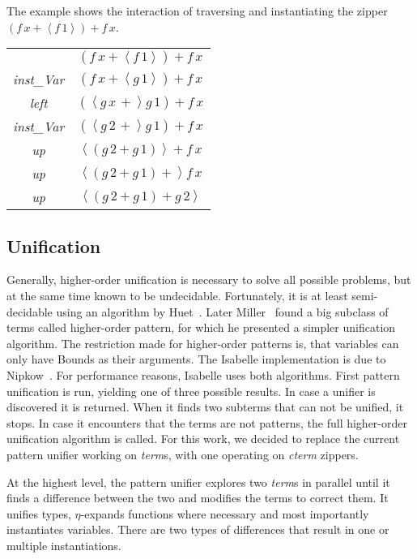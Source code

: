 \documentclass[12pt,a4paper]{article}
\newcommand{\type}[1]{\textit{#1}}
\newcommand{\function}[1]{\textit{#1}}
\begin{document}
The example shows the interaction of traversing and instantiating the zipper \((f\,x + \left\langle f\,1 \right\rangle) + f\,x\).

{
    \begin{center}
\begin{tabular}{cc}
&\((f\,x + \left\langle f\,1 \right\rangle) + f\,x\)\\
\function{inst\_Var}&\((f\,x + \left\langle g\,1 \right\rangle) + f\,x\)\\
\function{left}&\((\left\langle g\,x\,+ \right\rangle g\,1) + f\,x\)\\
\function{inst\_Var}&\((\left\langle g\,2\,+ \right\rangle g\,1) + f\,x\)\\
\function{up}&\(\left\langle( g\,2 + g\,1)\right\rangle + f\,x\)\\
\function{up}&\(\left\langle( g\,2 + g\,1) + \right\rangle f\,x\)\\
\function{up}&\(\left\langle( g\,2 + g\,1) + g\,2 \right\rangle\)
\end{tabular}
\end{center}
}

\subsection*{Unification}
Generally, higher-order unification is necessary to solve all possible problems, but at the same time known to be undecidable.
Fortunately, it is at least semi-decidable using an algorithm by Huet~\cite{Huet1975}.
Later Miller~\cite{Miller1991} found a big subclass of terms called higher-order pattern, for which he presented a simpler unification algorithm.
The restriction made for higher-order patterns is, that variables can only have Bounds as their arguments.
The Isabelle implementation is due to Nipkow~\cite{Nipkow1993}.
For performance reasons, Isabelle uses both algorithms.
First pattern unification is run, yielding one of three possible results.
In case a unifier is discovered it is returned.
When it finds two subterms that can not be unified, it stops.
In case it encounters that the terms are not patterns, the full higher-order unification algorithm is called.
For this work, we decided to replace the current pattern unifier working on \type{term}s, with one operating on \type{cterm} zippers.

At the highest level, the pattern unifier explores two \type{term}s in parallel until it finds a difference between the two and modifies the terms to correct them.
It unifies types, \(\eta\)-expands functions where necessary and most importantly instantiates variables.
There are two types of differences that result in one or multiple instantiations.
\end{document}
